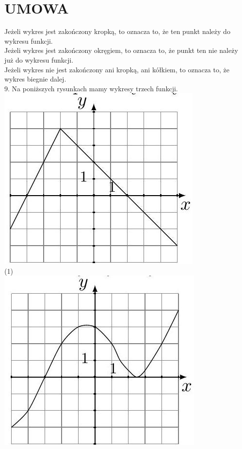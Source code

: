 \documentclass[10pt]{article}
\begin{document}
\section*{UMOWA}
Jeżeli wykres jest zakończony kropką, to oznacza to, że ten punkt należy do wykresu funkcji.\\
Jeżeli wykres jest zakończony okręgiem, to oznacza to, że punkt ten nie należy już do wykresu funkcji.\\
Jeżeli wykres nie jest zakończony ani kropką, ani kółkiem, to oznacza to, że wykres biegnie dalej.\\
9. Na poniższych rysunkach mamy wykresy trzech funkcji.\\
\includegraphics[max width=\textwidth, center]{2024_11_21_e9b4faa005d5be2cc318g-124(2)}\\
(1)\\
\includegraphics[max width=\textwidth, center]{2024_11_21_e9b4faa005d5be2cc318g-124}\\
\end{document}
